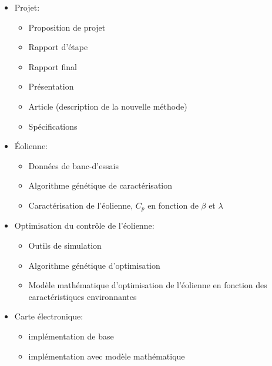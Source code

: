 \documentclass[11pt]{article}
\begin{document}
\begin{itemize}[label={$\bullet$}]
  \item Projet:
  \begin{itemize}
    \item Proposition de projet
    \item Rapport d'étape
    \item Rapport final
    \item Présentation
    \item Article (description de la nouvelle méthode)
    \item Spécifications
  \end{itemize}
  \item Éolienne:
  \begin{itemize}
    \item Données de banc-d'essais
    \item Algorithme génétique de caractérisation
    \item Caractérisation de l'éolienne, $C_p$ en fonction de $\beta$ et $\lambda$
  \end{itemize}
  \item Optimisation du contrôle de l'éolienne:
  \begin{itemize}
    \item Outils de simulation
    \item Algorithme génétique d'optimisation
    \item Modèle mathématique d'optimisation de l'éolienne en fonction des caractéristiques environnantes
  \end{itemize}
  \item Carte électronique:
  \begin{itemize}
    \item implémentation de base
    \item implémentation avec modèle mathématique
  \end{itemize}
\end{itemize}
\end{document}
